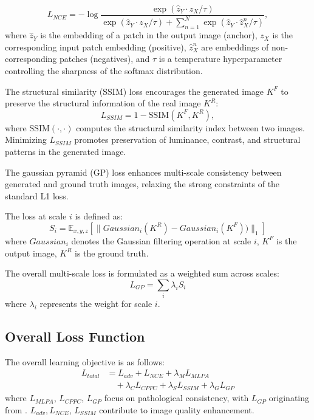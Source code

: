 \documentclass[journal,twoside,web]{ieeecolor}
\begin{document}
{
\begin{equation}
{L}_{{NCE}} = - \log \frac{\exp(\hat{z}_Y \cdot z_X / \tau)}
{\exp(\hat{z}_Y \cdot z_X / \tau) + \sum_{n=1}^{N} \exp(\hat{z}_Y \cdot \hat{z}_X^n / \tau)},
\end{equation}
}
{where $\hat{z}_Y$ is the embedding of a patch in the output image (anchor), $z_X$ is the corresponding input patch embedding (positive), $\hat{z}_X^n$ are embeddings of non-corresponding patches (negatives), and $\tau$ is a temperature hyperparameter controlling the sharpness of the softmax distribution.}


{The structural similarity (SSIM) loss encourages the generated image $K^F$ to preserve the structural information of the real image $K^R$:}
{
\begin{equation}
{L}_{{SSIM}} = 1 - \text{SSIM}(K^F, K^R),
\end{equation}
}
{where $\text{SSIM}(\cdot, \cdot)$ computes the structural similarity index between two images. Minimizing ${L}_{{SSIM}}$ promotes preservation of luminance, contrast, and structural patterns in the generated image.}



{
The gaussian pyramid (GP) loss \cite{liu2022bci} enhances multi-scale consistency between generated and ground truth images, relaxing the strong constraints of the standard L1 loss.}

{The loss at scale $i$ is defined as:}
{
\begin{equation}
S_i = \mathbb{E}_{x,y,z}\left[\|Gaussian_i(K^R) - Gaussian_i(K^F))\|_1\right]
\end{equation}
}
{where $Gaussian_i$ denotes the Gaussian filtering operation at scale $i$, $K^F$ is the output image, $K^R$ is the ground truth.}

{The overall multi-scale loss is formulated as a weighted sum across scales:}
{
\begin{equation}
L_{{GP}} = \sum_{i} \lambda_i S_i
\end{equation}
}
{where $\lambda_i$ represents the weight for scale $i$.}




\subsection{Overall Loss Function}
The overall learning objective is as follows:
\begin{equation}
\begin{aligned}
L_{total} &= L_{adv} + L_{NCE} + \lambda_{M}L_{MLPA} \\
&\quad + \lambda_{C}L_{CPPC} + \lambda_{S}L_{SSIM} + \lambda_{G}L_{GP}
\end{aligned}
\end{equation}
where $L_{MLPA}$, $L_{CPPC}$, $L_{GP}$ focus on pathological consistency, with $L_{GP}$ originating from \cite{liu2022bci}. $L_{adv}, L_{NCE}$, $L_{SSIM}$ contribute to image quality enhancement.
\end{document}

